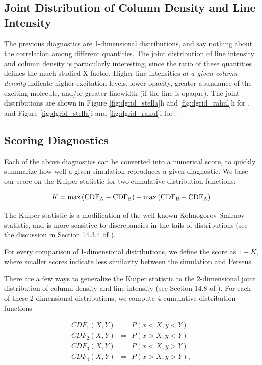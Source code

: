 {\subsection{Joint Distribution of Column Density and Line Intensity}
The previous diagnostics are 1-dimensional distributions, and say nothing about the correlation among different quantities. The joint distribution of line intensity and column density is particularly interesting, since the ratio of these quantities defines the much-studied X-factor. Higher line intensities \textit{at a given column density} indicate higher excitation levels, lower opacity, greater abundance of the exciting molecule, and/or greater linewidth (if the line is opaque). The joint distributions are shown in Figure  \ref{fig:dgrid_stella}h and \ref{fig:dgrid_rahul}h for \coa, and  Figure \ref{fig:dgrid_stella}i and \ref{fig:dgrid_rahul}i for \coc.


\subsection{Scoring Diagnostics}
Each of the above diagnostics can be converted into a numerical score, to quickly summarize how well a given simulation reproduces a given diagnostic. We base our score on the Kuiper statistic for two cumulative distribution functions:

\begin{equation}
K = \max {\rm \left(CDF_A - CDF_B \right) + \max \left( CDF_B - CDF_A \right) }
\end{equation}

The Kuiper statistic is a modification of the well-known Kolmogorov-Smirnov statistic, and is more sensitive to discrepancies in the tails of distributions (see the discussion in Section 14.3.4 of \citealt{Press07}).

For every comparison of 1-dimensional distributions, we define the score as $1 - K$, where smaller scores indicate less similarity between the simulation and Perseus.

There are a few ways to generalize the Kuiper statistic to the 2-dimensional joint distribution of column density and line intensity (see Section 14.8 of \citealt{Press07}). For each of these 2-dimensional distributions, we compute 4 cumulative distribution functions

\begin{eqnarray}
CDF_1(X, Y) &=& P(x < X, y < Y) \\
CDF_2(X, Y) &=& P(x > X, y < Y) \\
CDF_3(X, Y) &= &P(x < X, y > Y) \\
CDF_4(X, Y) &=& P(x > X, y > Y),
\end{eqnarray}

}
